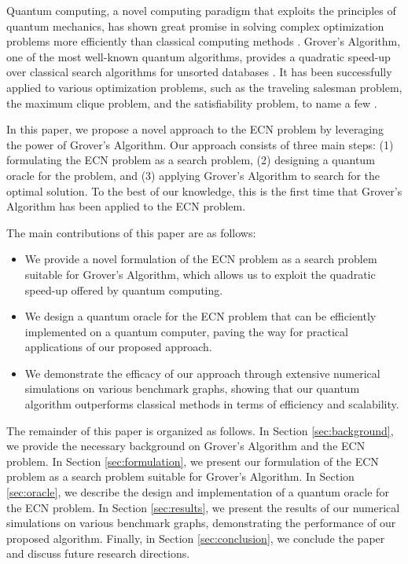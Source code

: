 Quantum computing, a novel computing paradigm that exploits the principles of quantum mechanics, has shown great promise in solving complex optimization problems more efficiently than classical computing methods \cite{6}. Grover's Algorithm, one of the most well-known quantum algorithms, provides a quadratic speed-up over classical search algorithms for unsorted databases \cite{7}. It has been successfully applied to various optimization problems, such as the traveling salesman problem, the maximum clique problem, and the satisfiability problem, to name a few \cite{8,9,10}.

In this paper, we propose a novel approach to the ECN problem by leveraging the power of Grover's Algorithm. Our approach consists of three main steps: (1) formulating the ECN problem as a search problem, (2) designing a quantum oracle for the problem, and (3) applying Grover's Algorithm to search for the optimal solution. To the best of our knowledge, this is the first time that Grover's Algorithm has been applied to the ECN problem.

The main contributions of this paper are as follows:

\begin{itemize}
    \item We provide a novel formulation of the ECN problem as a search problem suitable for Grover's Algorithm, which allows us to exploit the quadratic speed-up offered by quantum computing.
    \item We design a quantum oracle for the ECN problem that can be efficiently implemented on a quantum computer, paving the way for practical applications of our proposed approach.
    \item We demonstrate the efficacy of our approach through extensive numerical simulations on various benchmark graphs, showing that our quantum algorithm outperforms classical methods in terms of efficiency and scalability.
\end{itemize}

The remainder of this paper is organized as follows. In Section \ref{sec:background}, we provide the necessary background on Grover's Algorithm and the ECN problem. In Section \ref{sec:formulation}, we present our formulation of the ECN problem as a search problem suitable for Grover's Algorithm. In Section \ref{sec:oracle}, we describe the design and implementation of a quantum oracle for the ECN problem. In Section \ref{sec:results}, we present the results of our numerical simulations on various benchmark graphs, demonstrating the performance of our proposed algorithm. Finally, in Section \ref{sec:conclusion}, we conclude the paper and discuss future research directions.



